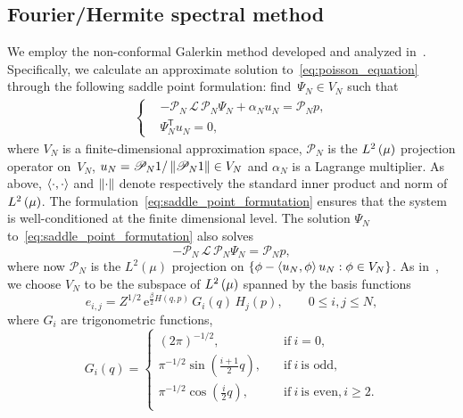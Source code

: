 \documentclass[11pt,a4paper]{article}
\newcommand{\e}{\mathrm{e}}
\renewcommand{\t}{\mathsf T}
\theoremstyle{plain}
\numberwithin{equation}{section}
\renewcommand{\leq}{\leqslant}
\renewcommand{\geq}{\geqslant}
\begin{document}
\subsection{Fourier/Hermite spectral method}%
\label{sub:galerkin_approach}
We employ the non-conformal Galerkin method developed and analyzed in~\cite{roussel2018spectral}.
Specifically, we calculate an approximate solution to~\eqref{eq:poisson_equation} through the following saddle point formulation:
find~$\Psi_N \in V_N$ such that
\begin{align}
  \label{eq:saddle_point_formutation}
  \left\{
    \begin{aligned}
       & - \mathscr P_N \, \mathcal L \, \mathscr P_N \Psi_N + \alpha_N u_N = \mathscr P_N p, \\
       & \Psi_N^\t u_N = 0,
    \end{aligned}
  \right.
\end{align}
where $V_N$ is a finite-dimensional approximation space,
$\mathscr P_N$ is the $\lp{2}{\mu}$ projection operator on~$V_N$,
$u_N = \mathscr P_N 1 / \norm{\mathscr P_N 1} \in V_N$
and $\alpha_N$ is a Lagrange multiplier.
As above,
$\ip{\cdot}{\cdot}$ and $\norm{\cdot}$ denote respectively the standard inner product and norm of $\lp{2}{\mu}$.
The formulation~\eqref{eq:saddle_point_formutation} ensures
that the system is well-conditioned at the finite dimensional level.
The solution $\Psi_N$ to~\eqref{eq:saddle_point_formutation} also solves
\[
    - \mathcal P_N \, \mathcal L \, \mathcal P_N \Psi_N = \mathcal P_N p,
\]
where now $\mathcal P_N$ is the $L^2(\mu)$ projection on $\{\phi - \ip{u_N}{\phi} u_N : \phi \in V_N\}$.
As in~\cite{roussel2018spectral},
we choose $V_N$ to be the subspace of $\lp{2}{\mu}$ spanned by the basis functions
\begin{equation}
  \label{eq:basis_functions}
  e_{i,j} = Z^{1/2} \, \e^{\frac{\beta}{2} H(q,p)}
  \, G_i(q) \, H_j(p), \qquad 0 \leq i,j \leq N,
\end{equation}
where $G_i$ are trigonometric functions,
\begin{equation}
  \label{eq:definition_trigonometric_functions}
  G_i(q) =
  \left\{ \begin{aligned}
    (2 \pi)^{-1/2}, \quad & \text{if}~i = 0, \\
    \pi^{-1/2} \sin\left(\frac{i + 1}{2}q\right), \quad & \text{if}~i~\text{is odd}, \\
    \pi^{-1/2} \cos\left(\frac{i}{2}q\right), \quad & \text{if}~i~\text{is even}, i \geq 2. \\
  \end{aligned} \right.
\end{equation}
\end{document}

